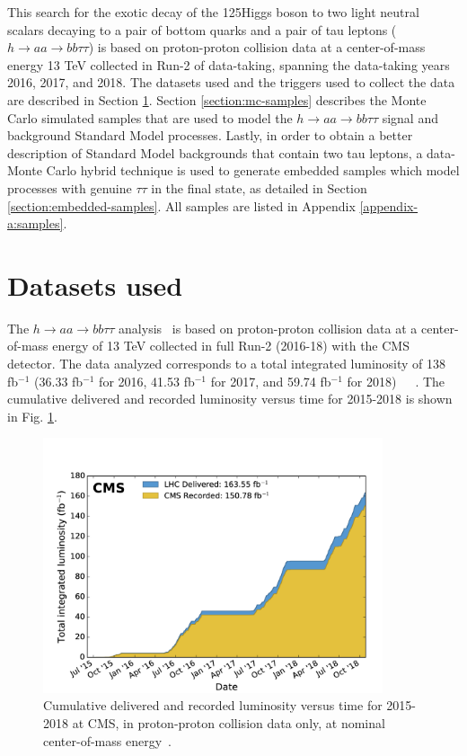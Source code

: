 This search for the exotic decay of the 125\GeV Higgs boson to two light neutral scalars decaying to a pair of bottom quarks and a pair of tau leptons ($h \rightarrow aa \rightarrow bb\tau\tau$) is based on proton-proton collision data at a center-of-mass energy 13 TeV collected in Run-2 of data-taking, spanning the data-taking years 2016, 2017, and 2018. The datasets used and the triggers used to collect the data are described in Section \ref{section:data-datasets}. Section \ref{section:mc-samples} describes the Monte Carlo simulated samples that are used to model the $h \rightarrow aa \rightarrow bb\tau\tau$ signal and background Standard Model processes. Lastly, in order to obtain a better description of Standard Model backgrounds that contain two tau leptons, a data-Monte Carlo hybrid technique is used to generate embedded samples which model processes with genuine $\tau\tau$ in the final state, as detailed in Section \ref{section:embedded-samples}. All samples are listed in Appendix \ref{appendix-a:samples}.

\section{Datasets used}
\label{section:data-datasets}
The $h \rightarrow aa \rightarrow bb\tau\tau$ analysis~\cite{CMS-HIG-22-007} is based on proton-proton collision data at a center-of-mass energy of 13 TeV collected in full Run-2 (2016-18) with the CMS detector. The data analyzed corresponds to a total integrated luminosity of 138 fb$^{-1}$ (36.33 fb$^{-1}$ for 2016, 41.53 fb$^{-1}$ for 2017, and 59.74 fb$^{-1}$ for 2018)~\cite{CMS-LUM-17-001}~\cite{CMS-LUM-17-004}~\cite{CMS-LUM-18-002}. The cumulative delivered and recorded luminosity versus time for 2015-2018 is shown in Fig. \ref{fig:integrated-luminosity-Run-2}.

\begin{figure}[ht]
    \centering
    \includegraphics[width=10cm]{figures/ch-4-datasets-monte-carlo/int_lumi_allcumulative_pp_run2}
    \caption[Cumulative delivered and recorded luminosity versus time for 2015-2018 at CMS, in proton-proton collision data only, at nominal center-of-mass energy.]{Cumulative delivered and recorded luminosity versus time for 2015-2018 at CMS, in proton-proton collision data only, at nominal center-of-mass energy~\cite{twiki_Lumi_Public_Results}.} 
    \label{fig:integrated-luminosity-Run-2}
\end{figure}

